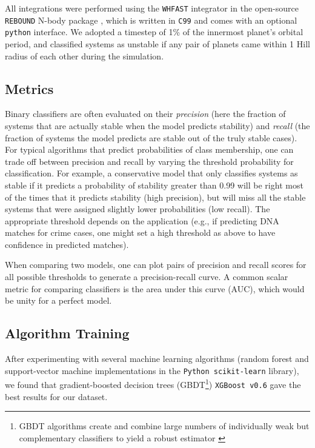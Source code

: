 All integrations were performed using the {\sc \tt WHFAST} integrator \citep{Rein2015b} in the open-source {\sc \tt REBOUND} N-body package \citep{Rein2012}, which is written in \texttt{C99} and comes with an optional \texttt{python} interface.
We adopted a timestep of 1\% of the innermost planet's orbital period, and classified systems as unstable if any pair of planets came within 1 Hill radius of each other during the simulation.

\subsection{Metrics} \label{metrics}
Binary classifiers are often evaluated on their {\it precision} (here the fraction of systems that are actually stable when the model predicts stability) and {\it recall} (the fraction of systems the model predicts are stable out of the truly stable cases).  
For typical algorithms that predict probabilities of class membership, one can trade off between precision and recall by varying the threshold probability for classification.
For example, a conservative model that only classifies systems as stable if it predicts a probability of stability greater than 0.99 will be right most of the times that it predicts stability (high precision), but will miss all the stable systems that were assigned slightly lower probabilities (low recall).
The appropriate threshold depends on the application (e.g., if predicting DNA matches for crime cases, one might set a high threshold as above to have confidence in predicted matches).

When comparing two models, one can plot pairs of precision and recall scores for all possible thresholds to generate a precision-recall curve.
A common scalar metric for comparing classifiers is the area under this curve (AUC), which would be unity for a perfect model.

\subsection{Algorithm Training} \label{training}
After experimenting with several machine learning algorithms (random forest and support-vector machine implementations in the {\tt Python scikit-learn} library), we found that gradient-boosted decision trees (GBDT\footnote{GBDT algorithms create and combine large numbers of individually weak but complementary classifiers to yield a robust estimator \citep{Friedman01}}) {\tt XGBoost v0.6} \citep{Chen16} gave the best results for our dataset.

